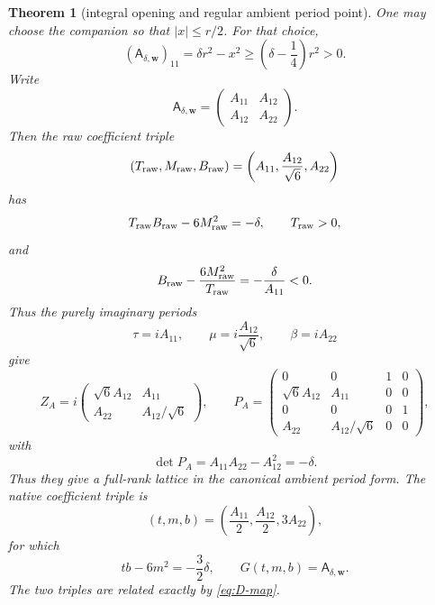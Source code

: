 \documentclass[11pt]{article}
\newtheorem{theorem}{Theorem}[section]
\theoremstyle{definition}
\theoremstyle{remark}
\newcommand{\1}{\mathbf 1}
\newcommand{\mat}[4]{\begin{pmatrix}#1&#2\\#3&#4\end{pmatrix}}
\begin{document}
\begin{theorem}[integral opening and regular ambient period point]
One may choose the companion so that $|x|\le r/2$.  For that choice,
\begin{equation}\label{eq:A11positive}
 (\mathsf A_{\delta,\mathbf w})_{11}
 =\delta r^2-x^2
 \ge\left(\delta-\frac14\right)r^2>0.
\end{equation}
Write
\begin{equation}\label{eq:Aentries}
 \mathsf A_{\delta,\mathbf w}=\mat{A_{11}}{A_{12}}{A_{12}}{A_{22}}.
\end{equation}
Then the raw coefficient triple
\begin{equation}\label{eq:raw-opening}
 (T_{\rm raw},M_{\rm raw},B_{\rm raw})
 =\left(A_{11},\frac{A_{12}}{\sqrt6},A_{22}\right)
\end{equation}
has
\begin{equation}\label{eq:raw-opening-disc}
 T_{\rm raw}B_{\rm raw}-6M_{\rm raw}^2=-\delta,
 \qquad
 T_{\rm raw}>0,
\end{equation}
and
\begin{equation}\label{eq:raw-sign}
 B_{\rm raw}-\frac{6M_{\rm raw}^2}{T_{\rm raw}}
 =-\frac\delta{A_{11}}<0.
\end{equation}
Thus the purely imaginary periods
\begin{equation}\label{eq:opening-periods}
 \tau=iA_{11},\qquad
 \mu=i\frac{A_{12}}{\sqrt6},\qquad
 \beta=iA_{22}
\end{equation}
give
\begin{equation}\label{eq:opening-ZP}
 Z_A=i\begin{pmatrix}
 \sqrt6A_{12}&A_{11}\\
 A_{22}&A_{12}/\sqrt6
 \end{pmatrix},\qquad
 P_A=\begin{pmatrix}
 0&0&1&0\\
 \sqrt6A_{12}&A_{11}&0&0\\
 0&0&0&1\\
 A_{22}&A_{12}/\sqrt6&0&0
 \end{pmatrix},
\end{equation}
with
\begin{equation}\label{eq:opening-P-det}
 \det P_A=A_{11}A_{22}-A_{12}^2=-\delta.
\end{equation}
Thus they give a full-rank lattice in the canonical ambient period form.  The native
coefficient triple is
\begin{equation}\label{eq:native-opening}
 (t,m,b)=\left(\frac{A_{11}}2,\frac{A_{12}}2,3A_{22}\right),
\end{equation}
for which
\begin{equation}\label{eq:native-opening-disc}
 tb-6m^2=-\frac32\delta,
 \qquad G(t,m,b)=\mathsf A_{\delta,\mathbf w}.
\end{equation}
The two triples are related exactly by \eqref{eq:D-map}.
\end{theorem}
\end{document}
